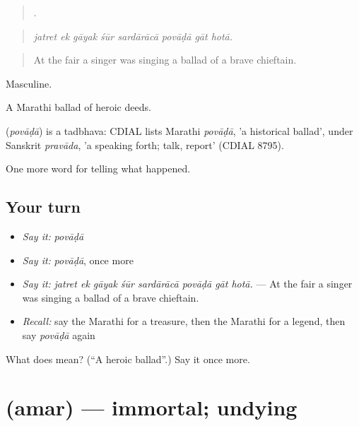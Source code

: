 \begin{quote}
       .
\end{quote}

\begin{quote}
\emph{jatret ek gāyak śūr sardārācā povāḍā gāt hotā.}
\end{quote}

\begin{quote}
At the fair a singer was singing a ballad of a brave chieftain.
\end{quote}

Masculine.

A Marathi ballad of heroic deeds.

\begin{cousinweb}
\textbf{} (\emph{povāḍā}) is a tadbhava: CDIAL lists Marathi \emph{povāḍā}, 'a historical ballad', under Sanskrit \emph{pravāda}, 'a speaking forth; talk, report' (CDIAL 8795).
\end{cousinweb}

\begin{grammarlens}[title={What you've built}]
One more word for telling what happened.
\end{grammarlens}

\subsection*{Your turn}
\begin{itemize}
\raggedright
  \item \emph{Say it:} \emph{povāḍā}
  \item \emph{Say it:} \emph{povāḍā}, once more
  \item \emph{Say it:} \emph{jatret ek gāyak śūr sardārācā povāḍā gāt hotā.} — At the fair a singer was singing a ballad of a brave chieftain.
  \item \emph{Recall:} say the Marathi for a treasure, then the Marathi for a legend, then say \emph{povāḍā} again
\end{itemize}

\begin{tcolorbox}[breakable,colback=teal!4,colframe=teal!35!black,title={Before you move on}]
What does  mean? (\textquotedblleft{}A heroic ballad\textquotedblright{}.) Say it once more.
\end{tcolorbox}
\section[\texorpdfstring{\mr{अमर} (amar)}{अमर (amar)}]{ (amar) — immortal; undying}

